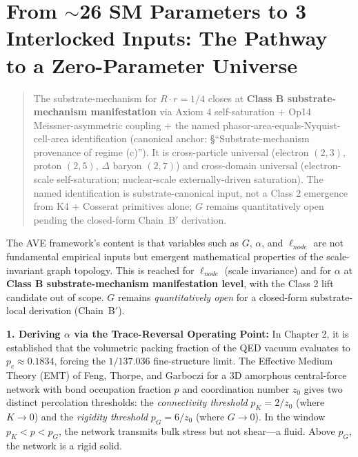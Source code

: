 \section{From $\sim$26 SM Parameters to 3 Interlocked Inputs: The Pathway to a Zero-Parameter Universe}
\label{sec:zero_parameter_pathway}

\begin{quote}
The substrate-mechanism for $R \cdot r = 1/4$ closes at \textbf{Class B substrate-mechanism manifestation} via Axiom 4 self-saturation $+$ Op14 Meissner-asymmetric coupling $+$ the named phasor-area-equals-Nyquist-cell-area identification (canonical anchor:  \S``Substrate-mechanism provenance of regime (c)''). It is cross-particle universal (electron $(2,3)$, proton $(2,5)$, $\Delta$ baryon $(2,7)$) and cross-domain universal (electron-scale self-saturation; nuclear-scale externally-driven saturation). The named identification is substrate-canonical input, not a Class 2 emergence from K4 $+$ Cosserat primitives alone; $G$ remains quantitatively open pending the closed-form Chain~B$'$ derivation.
\end{quote}

The AVE framework's content is that variables such as $G$, $\alpha$, and $\ell_{node}$ are not fundamental empirical inputs but emergent mathematical properties of the scale-invariant graph topology. This is reached for $\ell_{node}$ (scale invariance) and for $\alpha$ at \textbf{Class B substrate-mechanism manifestation level}, with the Class 2 lift candidate out of scope. $G$ remains \emph{quantitatively open} for a closed-form substrate-local derivation (Chain~B$'$).

\textbf{1. Deriving $\alpha$ via the Trace-Reversal Operating Point:}
In Chapter 2, it is established that the volumetric packing fraction of the QED vacuum evaluates to $p_c \approx 0.1834$, forcing the $1/137.036$ fine-structure limit. The Effective Medium Theory (EMT) of Feng, Thorpe, and Garboczi for a 3D amorphous central-force network with bond occupation fraction $p$ and coordination number $z_0$ gives two distinct percolation thresholds: the \textit{connectivity threshold} $p_K = 2/z_0$ (where $K \to 0$) and the \textit{rigidity threshold} $p_G = 6/z_0$ (where $G \to 0$). In the window $p_K < p < p_G$, the network transmits bulk stress but not shear---a fluid. Above $p_G$, the network is a rigid solid.

